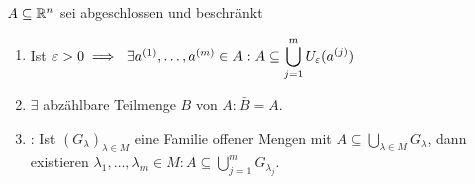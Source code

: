 \documentclass[a4paper,oneside,DIV15,BCOR12mm,chapterprefix=true,headings=onelinechapter]{scrbook}
\begin{document}
\begin{satz}[Überdeckungen]
$A \subseteq \mathbb{R}^n$ sei abgeschlossen und beschränkt
\begin{enumerate}
\item Ist $\varepsilon>0\implies\ \exists a^{(1)},\ldots,a^{(m)} \in A: A\subseteq \displaystyle\bigcup_{j=1}^m U_\varepsilon(a^{(j)})$
\item $\exists$ abzählbare Teilmenge $B$ von $A: \bar B=A$.
\item {}: Ist $(G_\lambda)_{\lambda \in M}$ eine Familie offener Mengen mit $A \subseteq \displaystyle\bigcup_{\lambda \in M} G_\lambda$, dann existieren $\lambda_1, \ldots, \lambda_m \in M: A\subseteq \displaystyle\bigcup_{j=1}^m G_{\lambda_j}$.
\end{enumerate}
\end{satz}
\end{document}
